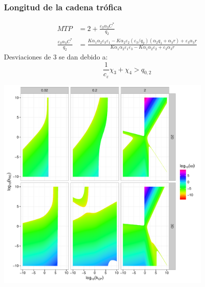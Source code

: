 \documentclass[11 pt,t]{beamer}
\begin{document}
\begin{frame}
  \frametitle{Longitud de la cadena tr\'ofica}
  \begin{equation*}
    \begin{aligned}
      MTP &= 2 + \frac{\varepsilon_3 \alpha_3 C^*}{q_2} \\
      \frac{\varepsilon_3 \alpha_3 C^*}{q_2} &= \frac{K \alpha_1 \alpha_2 \varepsilon_3 \varepsilon_1 - K \alpha_2 \varepsilon_2 (\varepsilon_3/q_2) (\alpha_2 q_1 + \alpha_3 r) + \varepsilon_3 \alpha_3 r}{ K \alpha_1\alpha_2 \varepsilon_1 \varepsilon_3 - K \alpha_1\alpha_2 \varepsilon_2 + \varepsilon_3 \alpha_3 r}
    \end{aligned}
  \end{equation*}
  \pause
  Desviaciones de 3 se dan debido a:
  \begin{equation*}
      \frac{1}{c_\varepsilon} \chi_3 + \chi_4  > q_{0,2}
   \end{equation*}
\end{frame}
\begin{frame}
  \centering
  \includegraphics[width = 0.8\textwidth]{../manuscript/Plots/MTPvar.pdf}
\end{frame}
\end{document}
